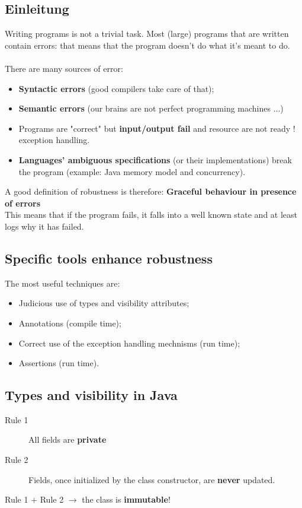 \documentclass[10pt]{article}
\begin{document}
\subsection{Einleitung}
Writing programs is not a trivial task. Most (large) programs that are written contain errors: that means that the program doesn't do what it's meant to do. \\
\\
There are many sources of error:
\begin{itemize}
	\item \textbf{Syntactic errors} (good compilers take care of that);
	\item \textbf{Semantic errors} (our brains are not perfect programming machines ...)
	\item Programs are "correct" but \textbf{input/output fail} and resource are not ready ! exception handling.
	\item \textbf{Languages' ambiguous specifications }(or their implementations) break the program (example: Java memory model and concurrency).
\end{itemize}
A good definition of robustness is therefore: \textbf{Graceful behaviour in presence of errors} \\
This means that if the program fails, it falls into a well known state and at least logs why it has failed.
\subsection{Specific tools enhance robustness}
The most useful techniques are:
\begin{itemize}
	\item Judicious use of types and visibility attributes;
	\item Annotations (compile time);
	\item Correct use of the exception handling mechnisms (run time);
	\item Assertions (run time).
\end{itemize}
\subsection{Types and visibility in Java}
\begin{description}
	\item[Rule 1] All fields are \textbf{private}
	\item[Rule 2] Fields, once initialized by the class constructor, are \textbf{never} updated.
\end{description}
Rule 1 + Rule 2 $\rightarrow$ the class is \textbf{immutable}!
\end{document}
